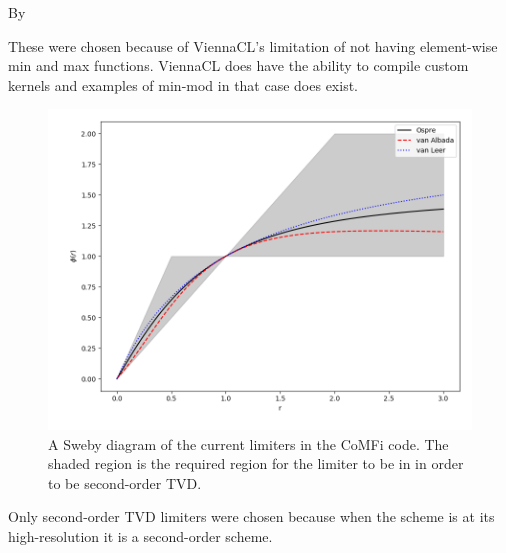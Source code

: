\documentclass[12pt,upcase]{umlthesis}
\begin{document}
By~\citet{vanleer1974}

These were chosen because of ViennaCL's limitation of not having element-wise min and max functions. ViennaCL does have the ability to compile custom kernels and examples of min-mod in that case does exist.

\begin{figure}[h!]\label{fig:sweby}
	\centering
	\includegraphics[width=1.0\linewidth]{images/sweby.png}
	\caption{A Sweby diagram of the current limiters in the CoMFi code. The shaded region is the required region for the limiter to be in in order to be second-order TVD\@.}
\end{figure}

Only second-order TVD limiters were chosen because when the scheme is at its high-resolution it is a second-order scheme.
\end{document}
